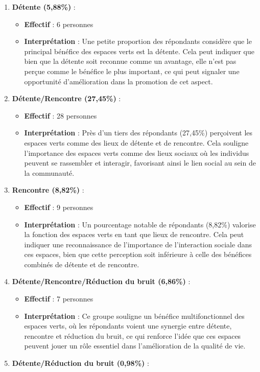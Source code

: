 \documentclass[
]{article}
\providecommand{\tightlist}{%
  \setlength{\itemsep}{0pt}\setlength{\parskip}{0pt}}
\begin{document}
\begin{enumerate}
\def\labelenumi{\arabic{enumi}.}
\tightlist
\item
  \textbf{Détente (5,88\%)} :

  \begin{itemize}
  \tightlist
  \item
    \textbf{Effectif} : 6 personnes
  \item
    \textbf{Interprétation} : Une petite proportion des répondants
    considère que le principal bénéfice des espaces verts est la
    détente. Cela peut indiquer que bien que la détente soit reconnue
    comme un avantage, elle n'est pas perçue comme le bénéfice le plus
    important, ce qui peut signaler une opportunité d'amélioration dans
    la promotion de cet aspect.
  \end{itemize}
\item
  \textbf{Détente/Rencontre (27,45\%)} :

  \begin{itemize}
  \tightlist
  \item
    \textbf{Effectif} : 28 personnes
  \item
    \textbf{Interprétation} : Près d'un tiers des répondants (27,45\%)
    perçoivent les espaces verts comme des lieux de détente et de
    rencontre. Cela souligne l'importance des espaces verts comme des
    lieux sociaux où les individus peuvent se rassembler et interagir,
    favorisant ainsi le lien social au sein de la communauté.
  \end{itemize}
\item
  \textbf{Rencontre (8,82\%)} :

  \begin{itemize}
  \tightlist
  \item
    \textbf{Effectif} : 9 personnes
  \item
    \textbf{Interprétation} : Un pourcentage notable de répondants
    (8,82\%) valorise la fonction des espaces verts en tant que lieux de
    rencontre. Cela peut indiquer une reconnaissance de l'importance de
    l'interaction sociale dans ces espaces, bien que cette perception
    soit inférieure à celle des bénéfices combinés de détente et de
    rencontre.
  \end{itemize}
\item
  \textbf{Détente/Rencontre/Réduction du bruit (6,86\%)} :

  \begin{itemize}
  \tightlist
  \item
    \textbf{Effectif} : 7 personnes
  \item
    \textbf{Interprétation} : Ce groupe souligne un bénéfice
    multifonctionnel des espaces verts, où les répondants voient une
    synergie entre détente, rencontre et réduction du bruit, ce qui
    renforce l'idée que ces espaces peuvent jouer un rôle essentiel dans
    l'amélioration de la qualité de vie.
  \end{itemize}
\item
  \textbf{Détente/Réduction du bruit (0,98\%)} :


\end{enumerate}
\end{document}
